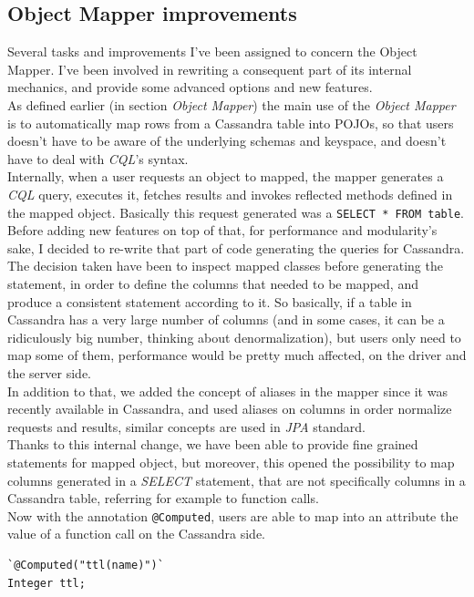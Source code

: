 \documentclass[a4paper]{report}
\begin{document}
\subsection{Object Mapper improvements}
Several tasks and improvements I've been assigned to concern the Object Mapper. I've been involved in rewriting a consequent part of its internal mechanics, and provide some advanced options and new features.\\
As defined earlier (in section \emph{Object Mapper}) the main use of the \emph{Object Mapper} is to automatically map rows from a Cassandra table into POJOs, so that users doesn't have to be aware of the underlying schemas and keyspace, and doesn't have to deal with \emph{CQL}'s syntax. \\
Internally, when a user requests an object to mapped, the mapper generates a \emph{CQL} query, executes it, fetches results and invokes reflected methods defined in the mapped object. Basically this request generated was a \verb;SELECT * FROM table;.\\ 
Before adding new features on top of that, for performance and modularity's sake, I decided to re-write that part of code generating the queries for Cassandra. The decision taken have been to inspect mapped classes before generating the statement, in order to define the columns that needed to be mapped, and produce a consistent statement according to it. So basically, if a table in Cassandra has a very large number of columns (and in some cases, it can be a ridiculously big number, thinking about denormalization), but users only need to map some of them, performance would be pretty much affected, on the driver and the server side.\\ 
In addition to that, we added the concept of aliases in the mapper since it was recently available in Cassandra, and used aliases on columns in order normalize requests and results, similar concepts are used in \emph{JPA} standard.\\ 
Thanks to this internal change, we have been able to provide fine grained statements for mapped object, but moreover, this opened the possibility to map columns generated in a \emph{SELECT} statement, that are not specifically columns in a Cassandra table, referring for example to function calls.\\
Now with the annotation \verb;@Computed;, users are able to map into an attribute the value of a function call on the Cassandra side. 
\begin{lstlisting}[label=om-ex-2, caption=@Computed on mapped fields, style=Java]
`@Computed("ttl(name)")`
Integer ttl;
\end{lstlisting}
\end{document}

